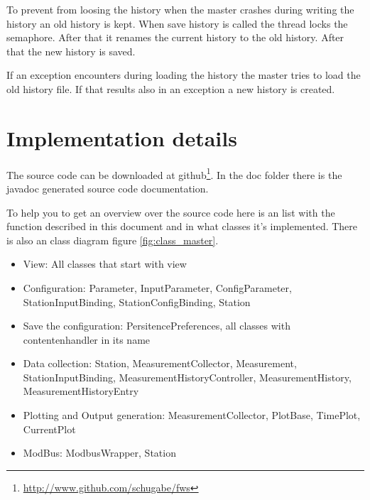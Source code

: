 To prevent from loosing the history when the master crashes during writing the history an old history is kept. When save history is called the thread locks the semaphore. After that it renames the current history to the old history. After that the new history is saved.

If an exception encounters during loading the history the master tries to load the old history file. If that results also in an exception a new history is created.

\section{Implementation details} %
\label{sec:implementation_details}
The source code can be downloaded at github\footnote{\url{http://www.github.com/schugabe/fws}}. In the doc folder there is the javadoc generated source code documentation.

To help you to get an overview over the source code here is an list with the function described in this document and in what classes it's implemented. There is also an class diagram figure \ref{fig:class_master}.

\begin{itemize}
    \item View: All classes that start with view
    \item Configuration: Parameter, InputParameter, ConfigParameter, StationInputBinding, StationConfigBinding, Station
    \item Save the configuration: PersitencePreferences, all classes with contentenhandler in its name
    \item Data collection: Station, MeasurementCollector, Measurement, StationInputBinding, MeasurementHistoryController, MeasurementHistory, MeasurementHistoryEntry
    \item Plotting and Output generation: MeasurementCollector, PlotBase, TimePlot, CurrentPlot
    \item ModBus: ModbusWrapper, Station
\end{itemize}

